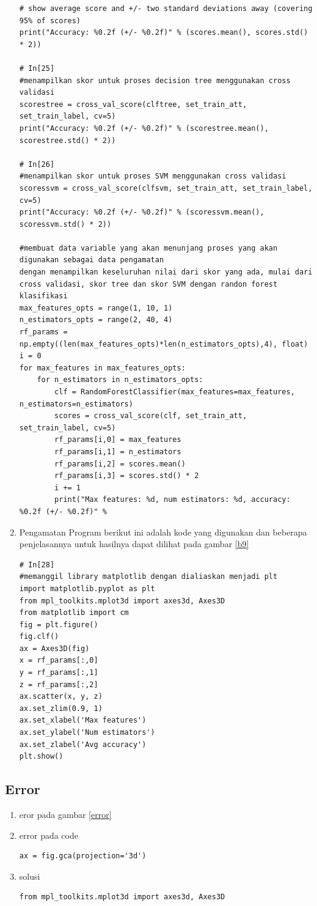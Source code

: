 \begin{enumerate}
\begin{verbatim}
# show average score and +/- two standard deviations away (covering 95% of scores)
print("Accuracy: %0.2f (+/- %0.2f)" % (scores.mean(), scores.std() * 2))

# In[25]
#menampilkan skor untuk proses decision tree menggunakan cross validasi
scorestree = cross_val_score(clftree, set_train_att, set_train_label, cv=5)
print("Accuracy: %0.2f (+/- %0.2f)" % (scorestree.mean(), scorestree.std() * 2))

# In[26]
#menampilkan skor untuk proses SVM menggunakan cross validasi
scoressvm = cross_val_score(clfsvm, set_train_att, set_train_label, cv=5)
print("Accuracy: %0.2f (+/- %0.2f)" % (scoressvm.mean(), scoressvm.std() * 2))

#membuat data variable yang akan menunjang proses yang akan digunakan sebagai data pengamatan
dengan menampilkan keseluruhan nilai dari skor yang ada, mulai dari cross validasi, skor tree dan skor SVM dengan randon forest klasifikasi
max_features_opts = range(1, 10, 1)
n_estimators_opts = range(2, 40, 4)
rf_params = np.empty((len(max_features_opts)*len(n_estimators_opts),4), float)
i = 0
for max_features in max_features_opts:
    for n_estimators in n_estimators_opts:
        clf = RandomForestClassifier(max_features=max_features, n_estimators=n_estimators)
        scores = cross_val_score(clf, set_train_att, set_train_label, cv=5)
        rf_params[i,0] = max_features
        rf_params[i,1] = n_estimators
        rf_params[i,2] = scores.mean()
        rf_params[i,3] = scores.std() * 2
        i += 1
        print("Max features: %d, num estimators: %d, accuracy: %0.2f (+/- %0.2f)" %
\end{verbatim}
\item Pengamatan Program
\subitem berikut ini adalah kode yang digunakan dan beberapa penjelasannya untuk hasilnya dapat dilihat pada gambar \ref{b9}
\begin{verbatim}
# In[28]
#memanggil library matplotlib dengan dialiaskan menjadi plt
import matplotlib.pyplot as plt
from mpl_toolkits.mplot3d import axes3d, Axes3D
from matplotlib import cm
fig = plt.figure()
fig.clf()
ax = Axes3D(fig)
x = rf_params[:,0]
y = rf_params[:,1]
z = rf_params[:,2]
ax.scatter(x, y, z)
ax.set_zlim(0.9, 1)
ax.set_xlabel('Max features')
ax.set_ylabel('Num estimators')
ax.set_zlabel('Avg accuracy')
plt.show()
\end{verbatim}
\end{enumerate}
\subsection{Error}
\begin{enumerate}
\item eror pada gambar \ref{error}
\item error pada code 
\begin{verbatim}
ax = fig.gca(projection='3d')
\end{verbatim}
\item solusi 
\begin{verbatim}
from mpl_toolkits.mplot3d import axes3d, Axes3D
\end{verbatim}
\end{enumerate}

